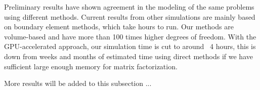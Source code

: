 Preliminary results have shown agreement in the modeling of the same problems using different methods.
Current results from other simulations are mainly based on boundary element methods, which take hours to run.
Our methods are volume-based and have more than 100 times higher degrees of freedom.
With the GPU-accelerated approach, our simulation time is cut to around ~4 hours, this is down from weeks and months of estimated time using direct methods if we have sufficient large enough memory for matrix factorization.

More results will be added to this subsection ...